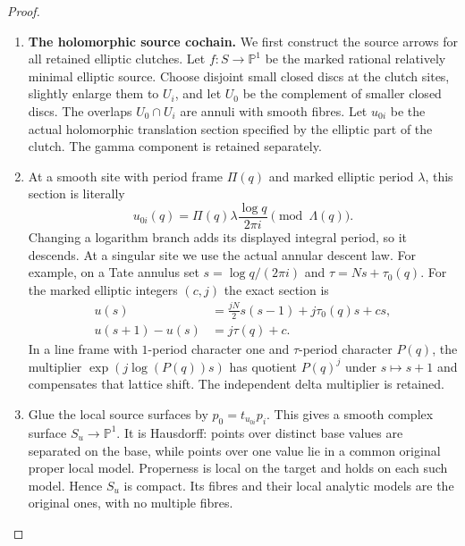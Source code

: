 \begin{proof}
\begin{enumerate}[label=\arabic*.]
\item \par\medskip\noindent\textbf{The holomorphic source cochain.}
We first construct the source arrows for all retained elliptic
clutches. Let $f:S\to\mathbb P^1$ be the marked rational
relatively minimal elliptic source. Choose disjoint small
closed discs at the clutch sites, slightly enlarge them to
$U_i$, and let $U_0$ be the complement of smaller closed discs.
The overlaps $U_0\cap U_i$ are annuli with smooth fibres.
Let $u_{0i}$ be the actual holomorphic translation section
specified by the elliptic part of the clutch. The gamma
component is retained separately.

\item At a smooth site with period frame $\Pi(q)$ and marked
elliptic period $\lambda$, this section is literally
\[
       u_{0i}(q)=\Pi(q)\lambda\frac{\log q}{2\pi i}
                         \pmod {\Lambda(q)}.
\]
Changing a logarithm branch adds its displayed integral
period, so it descends. At a singular site we use the actual
annular descent law. For example, on a Tate annulus set
$s=\log q/(2\pi i)$ and $\tau=Ns+\tau_0(q)$. For the
marked elliptic integers $(c,j)$ the exact section is
\[
 \begin{split}
 u(s)&=\frac{jN}{2}s(s-1)+j\tau_0(q)s+cs,\\
 u(s+1)-u(s)&=j\tau(q)+c.                             
 \end{split}\tag{K32.4}
\]
In a line frame with $1$-period character one and
$\tau$-period character $P(q)$, the multiplier
$\exp(j\log(P(q))s)$ has quotient $P(q)^j$ under
$s\mapsto s+1$ and compensates that lattice shift. The
independent delta multiplier is retained.

\item Glue the local source surfaces by
$p_0=t_{u_{0i}}p_i$. This gives a smooth complex surface
$S_u\to\mathbb P^1$. It is Hausdorff: points over distinct
base values are separated on the base, while points over
one value lie in a common original proper local model.
Properness is local on the target and holds on each such
model. Hence $S_u$ is compact. Its fibres and their local
analytic models are the original ones, with no multiple
fibres.


\end{enumerate}
\end{proof}
